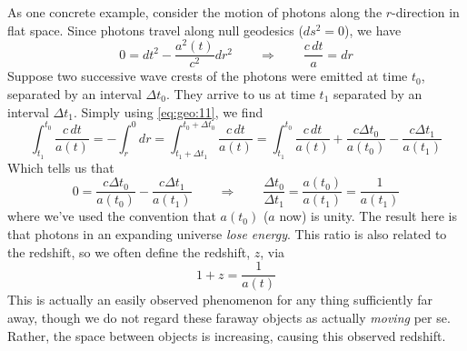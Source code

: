 \documentclass[10pt]{article}
\numberwithin{equation}{section}
\newcommand{\n}{\noindent}
\begin{document}
	\n As one concrete example, consider the motion of photons along the $r$-direction in flat space. Since photons travel along null geodesics ($ds^2=0$), we have
	\begin{equation}
		\label{eq:geo:11} 0=dt^2 - \frac{a^2(t)}{c^2}dr^2 \qquad \Rightarrow \qquad \frac{c\,dt}{a} = dr
	\end{equation}
	Suppose two successive wave crests of the photons were emitted at time $t_0$, separated by an interval $\Delta t_0$. They arrive to us at time $t_1$ separated by an interval $\Delta t_1$. Simply using \eqref{eq:geo:11}, we find
	\begin{equation}
		\label{eq:geo:12} \int_{t_1}^{t_0}\frac{c\,dt}{a(t)} = -\int_r^0dr =\int_{t_1+\Delta t_1}^{t_0+\Delta t_0}\frac{c\,dt}{a(t)} = \int_{t_1}^{t_0}\frac{c\,dt}{a(t)} + \frac{c\Delta t_0}{a(t_0)} - \frac{c\Delta t_1}{a(t_1)}
	\end{equation}
	Which tells us that
	\begin{equation}
		\label{eq:geo:13} 0 = \frac{c\Delta t_0}{a(t_0)} - \frac{c\Delta t_1}{a(t_1)} \qquad \Rightarrow \qquad \frac{\Delta t_0}{\Delta t_1} = \frac{a(t_0)}{a(t_1)} = \frac{1}{a(t_1)}
	\end{equation}
	where we've used the convention that $a(t_0)$ ($a$ now) is unity. The result here is that photons in an expanding universe \emph{lose energy}. This ratio is also related to the redshift, so we often define the redshift, $z$, via
	\begin{equation}
		\label{eq:geo:14} 1+z = \frac{1}{a(t)}
	\end{equation}
	This is actually an easily observed phenomenon for any thing sufficiently far away, though we do not regard these faraway objects as actually \emph{moving} per se. Rather, the space between objects is increasing, causing this observed redshift.
	
\end{document}
